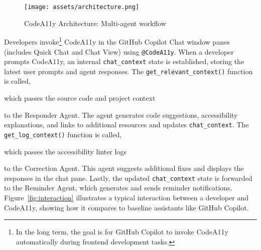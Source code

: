 \begin{highlight}
\begin{figure}
 \texttt{[image: assets/architecture.png]}
    \caption{CodeA11y Architecture: Multi-agent workflow}
    \label{fig:arch}
\end{figure}
\end{highlight}

Developers invoke\footnote{In the long term, the goal is for GitHub Copilot to invoke CodeA11y automatically during frontend development tasks.} CodeA11y in the GitHub Copilot Chat window panes (includes Quick Chat and Chat View) using \colorbox{codebgd}{\texttt{@CodeA11y}}. When a developer prompts CodeA11y, an internal \colorbox{codebgd}{\texttt{chat\_context}} state is established, storing the latest user prompts and agent responses. The \colorbox{codebgd}{\texttt{get\_relevant\_context()}} function is called, \begin{highlight}
which passes the source code and project context\end{highlight} to the Responder Agent. The agent generates code suggestions, accessibility explanations, and links to additional resources and updates \colorbox{codebgd}{\texttt{chat\_context}}. The \colorbox{codebgd}{\texttt{get\_log\_context()}} function is called, \begin{highlight}
which passes the accessibility linter logs\end{highlight} to the Correction Agent. This agent 
suggests additional fixes and displays the responses in the chat pane. Lastly, the updated \colorbox{codebgd}{\texttt{chat\_context}} state is forwarded to the Reminder Agent, which generates and sends reminder notifications. Figure~\ref{fig:interaction} illustrates a typical interaction between a developer and CodeA11y, showing how it compares to baseline assistants like GitHub Copilot.


